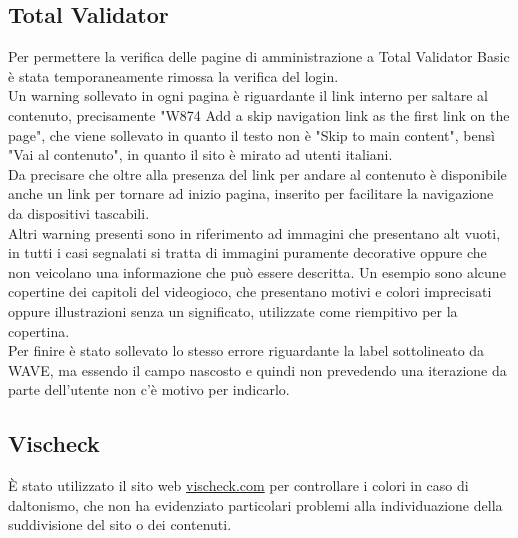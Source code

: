 \documentclass[openany, a4paper, 12pt]{report}
\begin{document}
			\subsection{Total Validator}
				Per permettere la verifica delle pagine di amministrazione a Total Validator Basic è stata temporaneamente rimossa la verifica del login.\\
				Un warning sollevato in ogni pagina è riguardante il link interno per saltare al contenuto, precisamente "W874 Add a skip navigation link as the first link on the page", che viene sollevato in quanto il testo non è "Skip to main content", bensì "Vai al contenuto", in quanto il sito è mirato ad utenti italiani.\\
				Da precisare che oltre alla presenza del link per andare al contenuto è disponibile anche un link per tornare ad inizio pagina, inserito per facilitare la navigazione da dispositivi tascabili.\\
				Altri warning presenti sono in riferimento ad immagini che presentano alt vuoti, in tutti i casi segnalati si tratta di immagini puramente decorative oppure che non veicolano una informazione che può essere descritta. Un esempio sono alcune copertine dei capitoli del videogioco, che presentano motivi e colori imprecisati oppure illustrazioni senza un  significato, utilizzate come riempitivo per la copertina.\\
				Per finire è stato sollevato lo stesso errore riguardante la label sottolineato da WAVE, ma essendo il campo nascosto e quindi non prevedendo una iterazione da parte dell'utente non c'è motivo per indicarlo.\\

			\subsection{Vischeck}
			\`{E} stato utilizzato il sito web \url{vischeck.com} per controllare i colori in caso di daltonismo, che non ha evidenziato particolari problemi alla individuazione della suddivisione del sito o dei contenuti.
			
\end{document}
